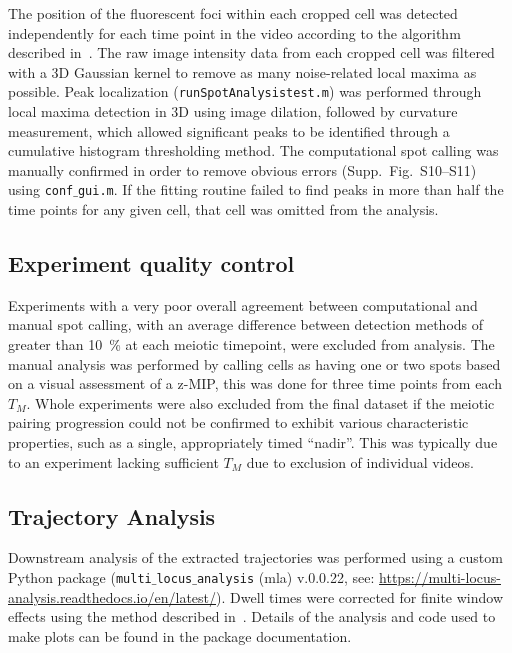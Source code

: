\documentclass[9pt,twocolumn,twoside,lineno]{pnas-new}
\begin{document}
The position of the fluorescent foci within each cropped cell was detected
independently for each time point in the video according to the algorithm
described in~\cite{thomann2002}. The raw image intensity data from each cropped
cell was filtered with a 3D Gaussian kernel to remove as many noise-related
local maxima as possible. Peak localization (\texttt{runSpotAnalysistest.m}) was
performed through local maxima detection in 3D using image dilation, followed by
curvature measurement, which allowed significant peaks to be identified through
a cumulative histogram thresholding method. The computational spot calling was
manually confirmed in order to remove obvious errors (Supp.\ Fig.\ S10--S11) using
\texttt{conf$\_$gui.m}. If the fitting routine failed to find peaks in more than
half the time points for any given cell, that cell was omitted from the
analysis.


\subsection*{Experiment quality control}


Experiments with a very poor overall agreement between computational and
manual spot calling, with an average difference between detection methods of
greater than \SI{10}{\%} at each meiotic timepoint, were excluded from analysis.
The manual analysis was performed by calling cells as having one or two spots
based on a visual assessment of a z-MIP, this was done for three time points
from each $T_M$. Whole experiments were also excluded from the final dataset if
the meiotic pairing progression could not be confirmed to exhibit various
characteristic properties, such as a single, appropriately timed ``nadir''. This was
typically due to an experiment lacking sufficient $T_M$ due to exclusion of
individual videos.


\subsection*{Trajectory Analysis}

Downstream analysis of the extracted trajectories was performed using a custom Python package
(\texttt{multi$\_$locus$\_$analysis} (mla) v.0.0.22, see:
\url{https://multi-locus-analysis.readthedocs.io/en/latest/}). Dwell times were
corrected for finite window effects using the method described
in~\cite{beltran2020}. Details of the analysis and code used to make plots can
be found in the package documentation.
\end{document}
